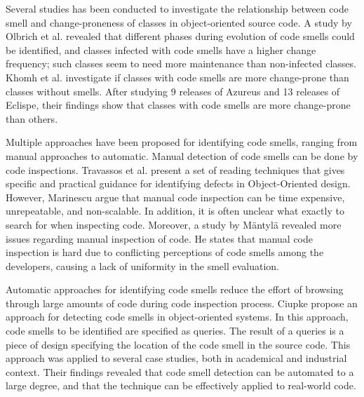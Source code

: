 Several studies has been conducted to investigate the relationship between code smell and change-proneness of classes in object-oriented source code. A study by Olbrich et al.\cite{olbrich2009evolution} revealed that different phases during evolution of code smells could be identified, and classes infected with code smells have a higher change frequency; such classes seem to need more maintenance than non-infected classes. Khomh et al.\cite{khomh2009exploratory} investigate if classes with code smells are more change-prone than classes without smells. After studying 9 releases of Azureus and 13 releases of Eclispe, their findings show that classes with code smells are more change-prone than others.

Multiple approaches have been proposed for identifying code smells, ranging from manual approaches to automatic. Manual detection of code smells can be done by code inspections\cite{travassos1999detecting}. Travassos et al.\cite{travassos1999detecting} present a set of reading techniques that gives specific and practical guidance for identifying defects in Object-Oriented design. However, Marinescu\cite{marinescu2001detecting} argue that manual code inspection can be time expensive, unrepeatable, and non-scalable. In addition, it is often unclear what exactly to search for when inspecting code\cite{ciupke1999automatic}. Moreover, a study by Mäntylä revealed more issues regarding manual inspection of code. He states that manual code inspection is hard due to conflicting perceptions of code smells among the developers, causing a lack of uniformity in the smell evaluation. 

Automatic approaches for identifying code smells reduce the effort of browsing through large amounts of code during code inspection process. Ciupke\cite{ciupke1999automatic} propose an approach for detecting code smells in object-oriented systems. In this approach, code smells to be identified are specified as queries. The result of a queries is a piece of design specifying the location of the code smell in the source code. This approach was applied to several case studies, both in academical and industrial context. Their findings revealed that code smell detection can be automated to a large degree, and that the technique can be effectively applied to real-world code.

